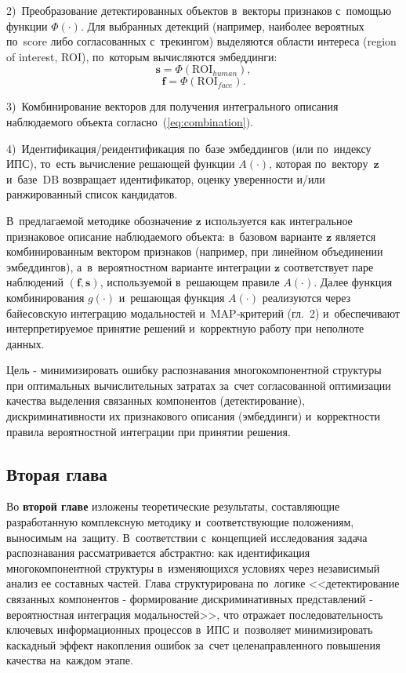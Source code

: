 2)~Преобразование детектированных объектов в~векторы признаков с~помощью функции
$\Phi(\cdot)$. Для выбранных детекций (например, наиболее вероятных по~score либо
согласованных с~трекингом) выделяются области интереса (region of interest, ROI),
по~которым вычисляются эмбеддинги:
\begin{equation}
    \mathbf{s}=\Phi(\mathrm{ROI}_{human}),
    \label{eq:emb-human}
\end{equation}
\begin{equation}
    \mathbf{f}=\Phi(\mathrm{ROI}_{face}).
    \label{eq:emb-face}
\end{equation}

3)~Комбинирование векторов для получения интегрального описания наблюдаемого
объекта согласно~(\ref{eq:combination}).

4)~Идентификация/реидентификация по~базе эмбеддингов (или по~индексу ИПС),
то~есть вычисление решающей функции $A(\cdot)$, которая по~вектору~$\mathbf{z}$
и~базе~$\mathrm{DB}$ возвращает идентификатор, оценку уверенности и/или
ранжированный список кандидатов.

В~предлагаемой методике обозначение $\mathbf{z}$ используется как интегральное
признаковое описание наблюдаемого объекта: в~базовом варианте $\mathbf{z}$ является
комбинированным вектором признаков (например, при линейном объединении эмбеддингов),
а~в~вероятностном варианте интеграции $\mathbf{z}$ соответствует паре наблюдений
$(\mathbf{f},\mathbf{s})$, используемой в~решающем правиле $A(\cdot)$.
Далее функция комбинирования $g(\cdot)$ и~решающая функция $A(\cdot)$ реализуются
через байесовскую интеграцию модальностей и~MAP‑критерий (гл.~2) и~обеспечивают
интерпретируемое принятие решений и~корректную работу при неполноте данных.

Цель - минимизировать ошибку распознавания многокомпонентной структуры
при оптимальных вычислительных затратах за~счет согласованной оптимизации
качества выделения связанных компонентов (детектирование),
дискриминативности их признакового описания (эмбеддинги) и~корректности
правила вероятностной интеграции при принятии решения.

\subsection*{Вторая глава}

Во \textbf{второй главе} изложены теоретические результаты, составляющие
разработанную комплексную методику и~соответствующие положениям,
выносимым на~защиту. В~соответствии с~концепцией исследования задача
распознавания рассматривается абстрактно: как идентификация
многокомпонентной структуры в~изменяющихся условиях через независимый
анализ ее составных частей. Глава структурирована по~логике
<<детектирование связанных компонентов - формирование дискриминативных
представлений - вероятностная интеграция модальностей>>, что отражает
последовательность ключевых информационных процессов в~ИПС и~позволяет
минимизировать каскадный эффект накопления ошибок за~счет
целенаправленного повышения качества на~каждом этапе.

